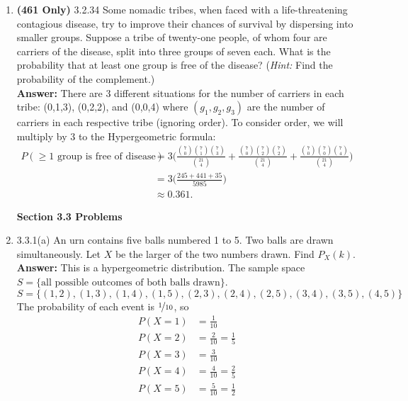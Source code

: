 \documentclass{article}
\begin{document}
\begin{enumerate}
        \item \textbf{(461 Only)} 3.2.34 Some nomadic tribes, when faced with a life-threatening contagious disease, try to improve their chances of survival by dispersing into smaller groups. Suppose a tribe of twenty-one people, of whom four are carriers of the disease, split into three groups of seven each. What is the probability that at least one group is free of the disease? (\textit{Hint:} Find the probability of the complement.)\\
        \textbf{Answer: }There are 3 different situations for the number of carriers in each tribe: (0,1,3), (0,2,2), and (0,0,4) where $(g_1,g_2,g_3)$ are the number of carriers in each respective tribe (ignoring order). To consider order, we will multiply by 3 to the Hypergeometric formula:
            \begin{align*}
                P(\geq 1 \text{ group is free of disease}) &= 3\Bigg(\frac{{7 \choose 0}{7 \choose 1}{7 \choose 3}}{{21 \choose 4}} + \frac{{7 \choose 0}{7 \choose 2}{7 \choose 2}}{{21 \choose 4}} + \frac{{7 \choose 0}{7 \choose 0}{7 \choose 4}}{{21 \choose 4}}\Bigg)\\
                &= 3\bigg(\frac{245+441+35}{5985}\bigg)\\
                &\approx 0.361. 
            \end{align*}
        
        \textbf{Section 3.3 Problems}\\
        \item 3.3.1(a) An urn contains five balls numbered 1 to 5. Two balls are drawn simultaneously. Let $X$ be the larger of the two numbers drawn. Find $P_X(k)$.\\
        \textbf{Answer: }This is a hypergeometric distribution. The sample space $S = \{\text{all possible outcomes of both balls drawn}\}$. 
            \[S = \{(1,2),(1,3),(1,4),(1,5),(2,3),(2,4),(2,5),(3,4),(3,5),(4,5)\}\]
        The probability of each event is $\nicefrac{1}{10}$, so
        \begin{align*}
            P(X = 1) &= \frac{1}{10}\\
            P(X = 2) &= \frac{2}{10} = \frac{1}{5}\\
            P(X = 3) &= \frac{3}{10}\\
            P(X = 4) &= \frac{4}{10} = \frac{2}{5}\\
            P(X = 5) &= \frac{5}{10} = \frac{1}{2}
        \end{align*}
        

\end{enumerate}
\end{document}
